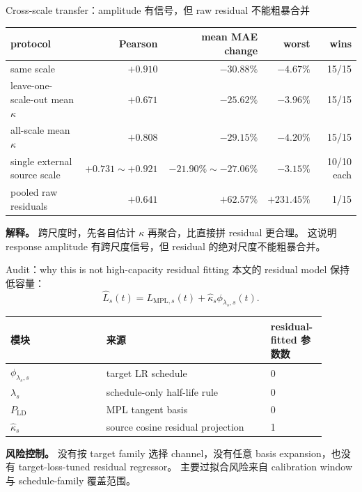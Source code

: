 \documentclass[9pt,aspectratio=169,fontset=fandol]{ctexbeamer}
\begin{document}
\begin{frame}{Cross-scale transfer：amplitude 有信号，但 raw residual 不能粗暴合并}
\small
\begin{center}
\begin{tabular}{lrrrr}
\toprule
protocol & Pearson & mean MAE change & worst & wins\\
\midrule
same scale & \(+0.910\) & \(-30.88\%\) & \(-4.67\%\) & 15/15\\
leave-one-scale-out mean \(\kappa\) & \(+0.671\) & \(-25.62\%\) & \(-3.96\%\) & 15/15\\
all-scale mean \(\kappa\) & \(+0.808\) & \(-29.15\%\) & \(-4.20\%\) & 15/15\\
single external source scale & \(+0.731\sim+0.921\) & \(-21.90\%\sim-27.06\%\) & \(-3.15\%\) & 10/10 each\\
pooled raw residuals & \(+0.641\) & \(+62.57\%\) & \(+231.45\%\) & 1/15\\
\bottomrule
\end{tabular}
\end{center}
\vfill
\textbf{解释。}
跨尺度时，先各自估计 \(\kappa\) 再聚合，比直接拼 residual 更合理。
这说明 response amplitude 有跨尺度信号，但 residual 的绝对尺度不能粗暴合并。
\end{frame}

\begin{frame}{Audit：why this is not high-capacity residual fitting}
\small
本文的 residual model 保持低容量：
\[
\widehat L_s(t)
=
L_{\mathrm{MPL},s}(t)
+\widehat\kappa_s\phi_{\lambda_s,s}(t).
\]
\vfill
\begin{center}
\begin{tabular}{L{0.28\linewidth}L{0.48\linewidth}L{0.14\linewidth}}
\toprule
模块 & 来源 & residual-fitted 参数数\\
\midrule
\(\phi_{\lambda_s,s}\) & target LR schedule & 0\\
\(\lambda_s\) & schedule-only half-life rule & 0\\
\(P_{\mathrm{LD}}\) & MPL tangent basis & 0\\
\(\widehat\kappa_s\) & source cosine residual projection & 1\\
\bottomrule
\end{tabular}
\end{center}
\vfill
\textbf{风险控制。}
没有按 target family 选择 channel，没有任意 basis expansion，也没有 target-loss-tuned residual regressor。
主要过拟合风险来自 calibration window 与 schedule-family 覆盖范围。
\end{frame}
\end{document}
